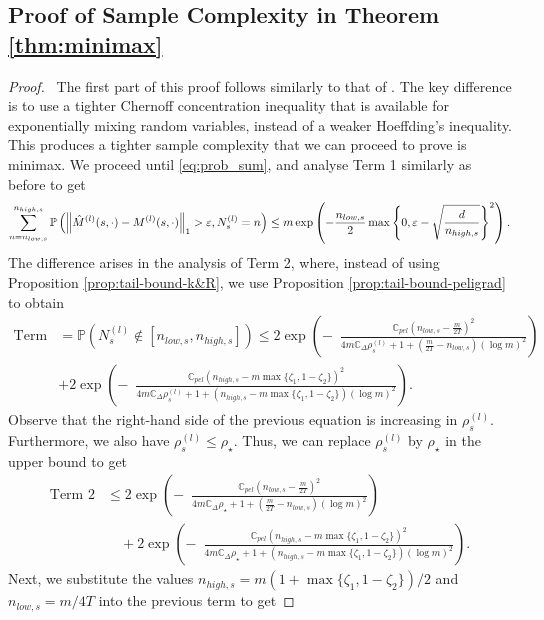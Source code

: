 \documentclass[opre,sglanonrev]{informs4}
\numberwithin{equation}{section}
\newcommand{\pow}[1]{^{(#1)}}
\newcommand{\lp}{\left(}
\newcommand{\rp}{\right)}
\newcommand{\Cbb}{\mathbb{C}}
\newcommand{\Pbb}{\mathbb{P}}
\newcommand{\constant}{\Cbb}
\newcommand{\hatmls}{\Hat{M}^{(l)}(s,\cdot)}
\newcommand{\mls}{{M}^{(l)}(s,\cdot)}
\newcommand{\prob}{\Pbb}
\newcommand{\eps}{\varepsilon}
\renewcommand{\epsilon}{\eps}
\begin{document}
\begin{APPENDICES}
\subsection{Proof of Sample Complexity in Theorem \ref{thm:minimax}}
{
\begin{proof} \
 The first part of this proof follows similarly to that of . The key difference is to use a tighter Chernoff concentration inequality that is available for exponentially mixing random variables, instead of a weaker Hoeffding's inequality. This produces a tighter sample complexity that we can proceed to prove is minimax.
We proceed until \cref{eq:prob_sum}, and analyse Term 1 similarly as before to get
\begin{equation}
     \sum_{n=n_{low,s}}^{n_{high,s}} \prob\left(\left\|\hatmls-\mls\right\|_1 > \epsilon, N_s^{(l)}=n \right)\leq m\exp\left({-\frac{n_{low,s}}{2} \max \left\{0,\epsilon-\sqrt{\frac{d}{n_{high,s}}}\right\}^2}\right).
\end{equation}
The difference arises in the analysis of Term 2, where, instead of using Proposition \ref{prop:tail-bound-k&R}, we use Proposition \ref{prop:tail-bound-peligrad} to obtain
\begin{align*}
    \text{Term 2} & = \prob\left(N_s^{(l)}\notin [n_{low,s} ,n_{high,s}]\right)\leq 2 \exp\left(- \; \ \frac{\constant_{pel}\lp n_{low,s}-\frac{m}{2T}\rp^2}{4m\constant_\Delta\rho_s\pow{l}+1+\lp \frac{m}{2T}-n_{low,s}\rp\lp\log m\rp^2}  \right)\\
    & + 2 \exp\left(- \; \ \frac{\constant_{pel}\lp n_{high,s}-m\max\{\zeta_1,1-\zeta_2\}\rp^2}{4m\constant_\Delta\rho_s\pow{l}+1+\lp n_{high,s}-m\max\{\zeta_1,1-\zeta_2\}\rp\lp\log m\rp^2}  \right).
\end{align*}
Observe that the right-hand side of the previous equation is increasing in $\rho_s\pow{l}$. 
Furthermore, we also have $\rho_s\pow{l}\leq \rho_\star$. 
Thus, we can replace $\rho_s\pow{l}$ by $\rho_\star$ in the upper bound to get
\begin{align*}
    \text{Term 2} & \leq 2 \exp\left(- \; \ \frac{\constant_{pel}\lp n_{low,s}-\frac{m}{2T}\rp^2}{4m\constant_\Delta\rho_\star+1+\lp \frac{m}{2T}-n_{low,s}\rp\lp\log m\rp^2}  \right)\\
    &\quad + 2 \exp\left(- \; \ \frac{\constant_{pel}\lp n_{high,s}-m\max\{\zeta_1,1-\zeta_2\}\rp^2}{4m\constant_\Delta\rho_\star+1+\lp n_{high,s}-m\max\{\zeta_1,1-\zeta_2\}\rp\lp\log m\rp^2}  \right).
\end{align*}
\noindent Next, we substitute the values $n_{high,s}=m(1+\max\{\zeta_1,1-\zeta_2\})/2$ and $n_{low,s}=m/4T$ into the previous term to get

\end{proof}}
\end{APPENDICES}
\end{document}
